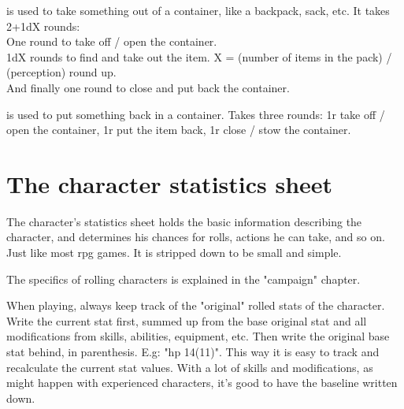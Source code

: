  is used to take something out of a container, like a backpack, sack, etc. It takes 2+1dX rounds: \\
One round to take off / open the container. \\
1dX rounds to find and take out the item. X = (number of items in the pack) / (perception) round up. \\
And finally one round to close and put back the container.


 is used to put something back in a container. Takes three rounds: 1r take off / open the container, 1r put the item back, 1r close / stow the container.


\closeactionslist

















\section*{The character statistics sheet}
\label{sec:charsheet}

The character's statistics sheet holds the basic information describing the character, and determines his chances for rolls, actions he can take, and so on. Just like most rpg games. It is stripped down to be small and simple.

The specifics of rolling characters is explained in the "campaign" chapter.

When playing, always keep track of the "original" rolled stats of the character. Write the current stat first, summed up from the base original stat and all modifications from skills, abilities, equipment, etc. Then write the original base stat behind, in parenthesis. E.g: "hp 14(11)". This way it is easy to track and recalculate the current stat values. With a lot of skills and modifications, as might happen with experienced characters, it's good to have the baseline written down.

